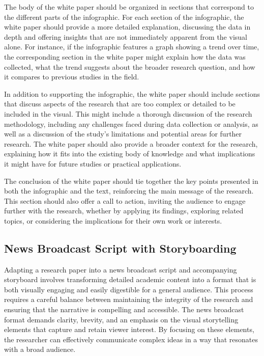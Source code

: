 \documentclass[
]{book}
\begin{document}
The body of the white paper should be organized in sections that correspond to the different parts of the infographic. For each section of the infographic, the white paper should provide a more detailed explanation, discussing the data in depth and offering insights that are not immediately apparent from the visual alone. For instance, if the infographic features a graph showing a trend over time, the corresponding section in the white paper might explain how the data was collected, what the trend suggests about the broader research question, and how it compares to previous studies in the field.

In addition to supporting the infographic, the white paper should include sections that discuss aspects of the research that are too complex or detailed to be included in the visual. This might include a thorough discussion of the research methodology, including any challenges faced during data collection or analysis, as well as a discussion of the study's limitations and potential areas for further research. The white paper should also provide a broader context for the research, explaining how it fits into the existing body of knowledge and what implications it might have for future studies or practical applications.

The conclusion of the white paper should tie together the key points presented in both the infographic and the text, reinforcing the main message of the research. This section should also offer a call to action, inviting the audience to engage further with the research, whether by applying its findings, exploring related topics, or considering the implications for their own work or interests.

\subsection*{News Broadcast Script with Storyboarding}\label{news-broadcast-script-with-storyboarding}

Adapting a research paper into a news broadcast script and accompanying storyboard involves transforming detailed academic content into a format that is both visually engaging and easily digestible for a general audience. This process requires a careful balance between maintaining the integrity of the research and ensuring that the narrative is compelling and accessible. The news broadcast format demands clarity, brevity, and an emphasis on the visual storytelling elements that capture and retain viewer interest. By focusing on these elements, the researcher can effectively communicate complex ideas in a way that resonates with a broad audience.
\end{document}
